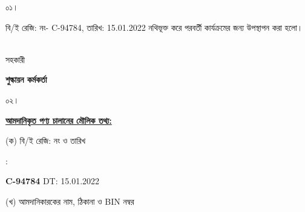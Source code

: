 \documentclass[12pt]{article}
\newcommand{\beno}{C-94784}
\newcommand{\bedt}{15.01.2022}
\begin{document}
\noindent
\begin{minipage}[t]{0.05\linewidth}
০১।
\end{minipage}
\begin{minipage}[t]{0.95\linewidth}
বি/ই রেজি: নং- {\beno}, তারিখ: {\bedt}
নথিভূক্ত করে
পরবর্তী কার্যক্রমের জন্য উপস্থাপন করা হলো।
\\
\\
\end{minipage}
\begin{minipage}[t]{0.05\linewidth}
\hspace*{0em}
\end{minipage}
\begin{minipage}[t]{0.05\linewidth}
সহকারী
\end{minipage}
\begin{minipage}[t]{0.37\linewidth}
\hspace{0em}
\end{minipage}
\begin{minipage}[t]{0.53\linewidth}
\textbf{শুল্কায়ন কর্মকর্তা}
\\
\end{minipage}
\begin{minipage}[t]{0.05\linewidth}
০২।
\end{minipage}
\begin{minipage}[t]{0.95\linewidth}
\underline{\textbf {আমদানিকৃত পণ্য চালানের
মৌলিক তথ্য:}}
\\
\end{minipage}
\footnotesize
\begin{minipage}[t]{0.05\linewidth}
\hspace*{1em}
\end{minipage}
\begin{minipage}[t]{0.40\linewidth}
(ক) বি/ই রেজি: নং ও তারিখ
\end{minipage}
\begin{minipage}[t]{0.02\linewidth}
:
\end{minipage}
\begin{minipage}[t]{0.53\linewidth}
\textbf{{\beno}} \hspace{2em} DT: {\bedt}
\\
\end{minipage}
\begin{minipage}[t]{0.05\linewidth}
\hspace*{1em}
\end{minipage}
\begin{minipage}[t]{0.40\linewidth}
(খ) আমদানিকারকের নাম, ঠিকানা
ও BIN নম্বর
\end{minipage}
\end{document}
